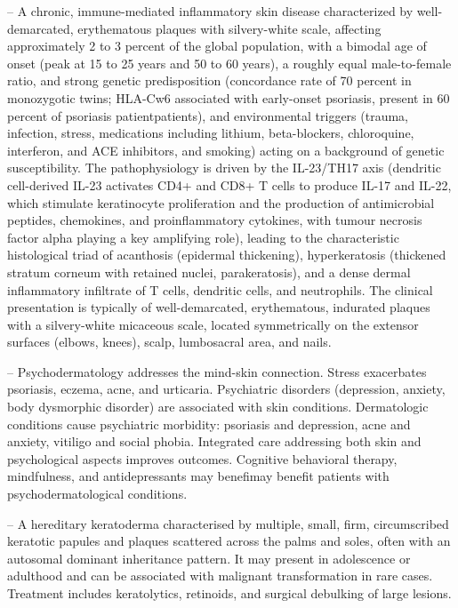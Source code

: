 -- A chronic, immune-mediated inflammatory skin disease characterized by well-demarcated, erythematous plaques with silvery-white scale, affecting approximately 2 to 3 percent of the global population, with a bimodal age of onset (peak at 15 to 25 years and 50 to 60 years), a roughly equal male-to-female ratio, and strong genetic predisposition (concordance rate of 70 percent in monozygotic twins; HLA-Cw6 associated with early-onset psoriasis, present in 60 percent of psoriasis patientpatients), and environmental triggers (trauma, infection, stress, medications including lithium, beta-blockers, chloroquine, interferon, and ACE inhibitors, and smoking) acting on a background of genetic susceptibility. The pathophysiology is driven by the IL-23/TH17 axis (dendritic cell-derived IL-23 activates CD4+ and CD8+ T cells to produce IL-17 and IL-22, which stimulate keratinocyte proliferation and the production of antimicrobial peptides, chemokines, and proinflammatory cytokines, with tumour necrosis factor alpha playing a key amplifying role), leading to the characteristic histological triad of acanthosis (epidermal thickening), hyperkeratosis (thickened stratum corneum with retained nuclei, parakeratosis), and a dense dermal inflammatory infiltrate of T cells, dendritic cells, and neutrophils. The clinical presentation is typically of well-demarcated, erythematous, indurated plaques with a silvery-white micaceous scale, located symmetrically on the extensor surfaces (elbows, knees), scalp, lumbosacral area, and nails.

-- Psychodermatology addresses the mind-skin connection. Stress exacerbates psoriasis, eczema, acne, and urticaria. Psychiatric disorders (depression, anxiety, body dysmorphic disorder) are associated with skin conditions. Dermatologic conditions cause psychiatric morbidity: psoriasis and depression, acne and anxiety, vitiligo and social phobia. Integrated care addressing both skin and psychological aspects improves outcomes. Cognitive behavioral therapy, mindfulness, and antidepressants may benefimay benefit patients with psychodermatological conditions.

-- A hereditary keratoderma characterised by multiple, small, firm, circumscribed keratotic papules and plaques scattered across the palms and soles, often with an autosomal dominant inheritance pattern. It may present in adolescence or adulthood and can be associated with malignant transformation in rare cases. Treatment includes keratolytics, retinoids, and surgical debulking of large lesions.

